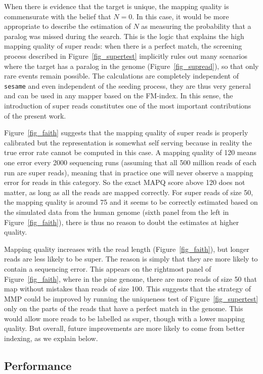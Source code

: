 \documentclass[english]{article}
\begin{document}
When there is evidence that the target is unique, the mapping quality is
commensurate with the belief that $N = 0$. In this case, it would be more
appropriate to describe the estimation of $N$ as measuring the probability
that a paralog was missed during the search. This is the logic that
explains the high mapping quality of super reads: when there is a perfect
match, the screening process described in Figure~\ref{fig_supertest}
implicitly rules out many scenarios where the target has a paralog in the
genome (Figure~\ref{fig_supread}), so that only rare events remain
possible. The calculations are completely independent of \texttt{sesame}
and even independent of the seeding process, they are thus very general
and can be used in any mapper based on the FM-index. In this sense, the
introduction of super reads constitutes one of the most important
contributions of the present work.

Figure~\ref{fig_faith} suggests that the mapping quality of super reads is
properly calibrated but the representation is somewhat self serving
because in reality the true error rate cannot be computed in this case. A
mapping quality of 120 means one error every 2000 sequencing runs
(assuming that all 500 million reads of each run are super reads), meaning
that in practice one will never observe a mapping error for reads in this
category. So the exact MAPQ score above 120 does not matter, as long as
all the reads are mapped correctly. For super reads of size 50, the
mapping quality is around 75 and it seems to be correctly estimated based
on the simulated data from the human genome (sixth panel from the left in
Figure~\ref{fig_faith}), there is thus no reason to doubt the
estimates at higher quality.

Mapping quality increases with the read length (Figure~\ref{fig_faith}),
but longer reads are less likely to be super. The reason is simply that
they are more likely to contain a sequencing error. This appears on the
rightmost panel of Figure~\ref{fig_faith}, where in the pine genome, there
are more reads of size 50 that map without mistakes than reads of size
100. This suggests that the strategy of MMP could be improved by running
the uniqueness test of Figure~\ref{fig_supertest} only on the parts of the
reads that have a perfect match in the genome. This would allow more reads
to be labelled as super, though with a lower mapping quality. But
overall, future improvements are more likely to come from better indexing,
as we explain below.


\subsection{Performance}
\end{document}
